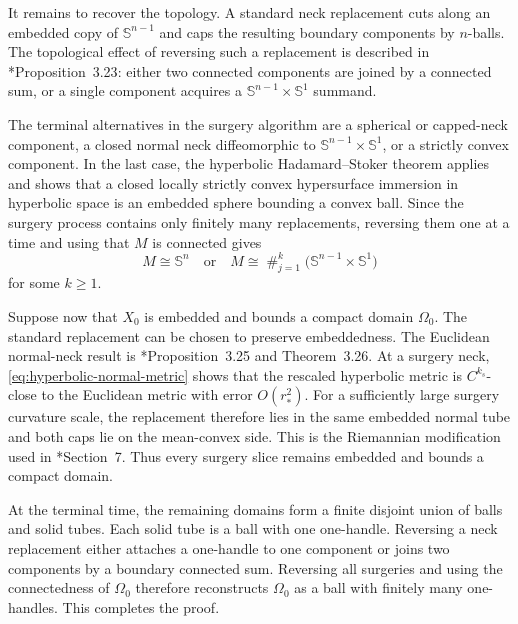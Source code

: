 \documentclass[11pt,reqno]{amsart}
\theoremstyle{definition}
\theoremstyle{remark}
\newtheorem{remark}[proposition]{Remark}
\numberwithin{equation}{section}
\newcommand{\Hh}{\mathbb H}
\newcommand{\Sph}{\mathbb S}
\begin{document}
  It remains to recover the topology.  A standard neck replacement cuts along
  an embedded copy of $\Sph^{n-1}$ and caps the resulting boundary components
  by $n$-balls.  The topological effect of reversing such a replacement is
  described in \cite{HS09}*{Proposition~3.23}: either two connected components
  are joined by a connected sum, or a single component acquires a
  $\Sph^{n-1}\times\Sph^1$ summand.

  The terminal alternatives in the surgery algorithm are a spherical or
  capped-neck component, a closed normal neck diffeomorphic to
  $\Sph^{n-1}\times\Sph^1$, or a strictly convex component.  In the last
  case, the hyperbolic Hadamard--Stoker theorem
  \cite{Alexander77} applies and shows that a closed locally strictly convex
  hypersurface immersion in hyperbolic space is an embedded sphere bounding a
  convex ball.  Since the surgery process contains only finitely many
  replacements, reversing them one at a time and using that $M$ is connected
  gives
  \begin{equation*}
  M\cong\Sph^n
  \quad\text{or}\quad
  M\cong
  \mathop{\#}_{j=1}^{k}
  \bigl(\Sph^{n-1}\times\Sph^1\bigr)
  \end{equation*}
  for some $k\geq1$.

  Suppose now that $X_0$ is embedded and bounds a compact domain $\Omega_0$.
  The standard replacement can be chosen to preserve embeddedness.  The
  Euclidean normal-neck result is
  \cite{HS09}*{Proposition~3.25 and Theorem~3.26}.  At a surgery neck,
  \eqref{eq:hyperbolic-normal-metric} shows that the rescaled hyperbolic metric
  is $C^{k_s}$-close to the Euclidean metric with error $O(r_*^2)$.  For a
  sufficiently large surgery curvature scale, the replacement therefore lies
  in the same embedded normal tube and both caps lie on the mean-convex side.
  This is the Riemannian modification used in \cite{BH17}*{Section~7}.  Thus
  every surgery slice remains embedded and bounds a compact domain.

  At the terminal time, the remaining domains form a finite disjoint union of
  balls and solid tubes.  Each solid tube is a ball with one one-handle.
  Reversing a neck replacement either attaches a one-handle to one component
  or joins two components by a boundary connected sum.  Reversing all
  surgeries and using the connectedness of $\Omega_0$ therefore reconstructs
  $\Omega_0$ as a ball with finitely many one-handles.   This completes the proof.


\end{document}
